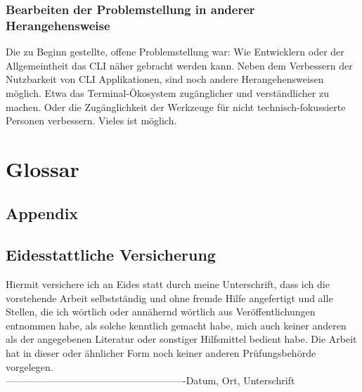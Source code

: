 \documentclass[oneside,bibliography=totocnumbered,BCOR=5mm]{scrbook}
\begin{document}
\subsection{Bearbeiten der Problemstellung in anderer Herangehensweise}

Die zu Beginn gestellte, offene Problemstellung war: Wie Entwicklern oder der
Allgemeintheit das CLI näher gebracht werden kann. Neben dem Verbessern der
Nutzbarkeit von CLI Applikationen, sind noch andere Herangehensweisen möglich.
Etwa das Terminal-Ökosystem zugänglicher und verständlicher zu machen. Oder
die Zugänglichkeit der Werkzeuge für nicht technisch-fokussierte Personen
verbessern. Vieles ist möglich.

\printbibliography[
heading=bibintoc,
title={Quellenverzeichnis}
]

\newpage
\chapter{Glossar}

\begin{appendix}
\chapter{Appendix}


\newpage
\thispagestyle{empty}
\noindent

\section*{Eidesstattliche Versicherung}
Hiermit versichere ich an Eides statt durch meine Unterschrift, dass ich die vorstehende Arbeit selbstst\"andig und ohne fremde Hilfe angefertigt und alle Stellen, die ich w\"ortlich oder ann\"ahernd w\"ortlich aus Ver\"offentlichungen entnommen habe, als solche kenntlich gemacht habe, mich auch keiner anderen als der angegebenen Literatur oder sonstiger Hilfsmittel bedient habe. Die Arbeit hat in dieser oder \"ahnlicher Form noch keiner anderen Pr\"ufungsbeh\"orde vorgelegen.\\
\linebreak[4]
\linebreak[4]
\linebreak[4]
\linebreak[4]
-------------------------------------------------------\linebreak[4]
Datum, Ort, Unterschrift

\end{appendix}
\end{document}
